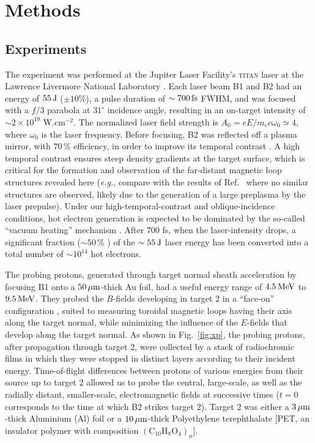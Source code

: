 \documentclass[aps,twocolumn,showpacs,superscriptaddress]{revtex4}
\begin{document}
\section*{Methods}
\subsection*{Experiments}
The experiment 
was performed at the Jupiter Laser Facility's \textsc{titan} laser at the Lawrence Livermore National Laboratory \cite{RSI_Albertazzi_2015}. Each laser beam B1 and B2 had an energy of $55\,\rm J$ ($\pm 10\%$), a pulse duration of $\sim 700\,\rm fs$ FWHM, and was focused with a $f/3$ parabola at $31^\circ$ incidence angle, resulting in an on-target intensity of $\sim 2\times 10^{19}$ W.cm$^{-2}$. The normalized laser field strength is $A_0 = eE/m_ec\omega_0 \simeq 4$, where $\omega_0$ is the laser frequency. Before focusing, B2 was reflected off a plasma mirror, with $70\,\%$ efficiency, in order to improve its temporal contrast \cite{PRE_Doumy_2004}. A high temporal contrast ensures steep density gradients at the target surface, which is critical for the formation and observation of the far-distant magnetic loop structures revealed here (\emph{e.g.}, compare with the results of Ref.~\cite{PRL_Sarri_2012} where no similar structures are observed, likely due to the generation of a large preplasma by the laser prepulse). Under our high-temporal-contrast and oblique-incidence conditions, hot electron generation is expected to be dominated by the so-called ``vacuum heating'' mechanism \cite{PRE_May_2011}. After $700$ fs, when the laser-intensity drops, a significant fraction ($\sim 50\,\%$ \cite{PRL_Ping_2008}) of the $\sim 55\,\rm J$ laser energy has been converted into a total number of $\sim 10^{14}$ hot electrons.

The probing protons, generated through target normal sheath acceleration \cite{PRL_Fuchs_2003} by focusing B1 onto a $50\,\rm \mu m$-thick Au foil, had a useful energy range of $4.5\,\rm MeV$ to $9.5\,\rm MeV$. They probed the $B$-fields developing in target 2 in a ``face-on'' configuration \cite{RSI_Albertazzi_2015}, suited to measuring toroidal magnetic loops having their axis along the target normal, while minimizing the influence of the $E$-fields that develop along the target normal. As shown in Fig.~\ref{fig:xp}, the probing protons, after propagation through target 2, were collected by a stack of radiochromic films in which they were stopped in distinct layers according to their incident energy. Time-of-flight differences between protons of various energies from their source up to target 2 allowed us to probe the central, large-scale, as well as the radially distant, smaller-scale, electromagnetic fields at successive times ($t=0$ corresponds to the time at which B2 strikes target 2). Target 2 was either a $3\,\rm \mu m$-thick Aluminium (Al) foil or a $10\,\rm \mu m$-thick Polyethylene terephthalate [PET, an insulator polymer with composition $(\mathrm{C}_{10}\mathrm{H}_8\mathrm{O}_4)_n$].
 
\end{document}
